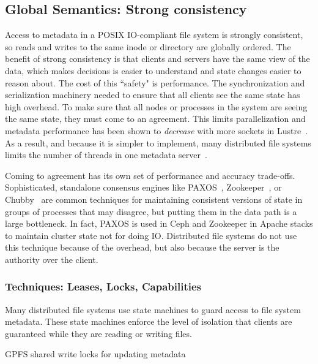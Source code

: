 \subsection{Global Semantics: Strong consistency}

Access to metadata in a POSIX IO-compliant file system is strongly consistent,
so reads and writes to the same inode or directory are globally ordered.  The
benefit of strong consistency is that clients and servers have the same view of
the data, which makes decisions is easier to understand and state changes
easier to reason about.  The cost of this ``safety" is performance.  The
synchronization and serialization machinery needed to ensure that all clients
see the same state has high overhead.  To make sure that all nodes or processes
in the system are seeing the same state, they must come to an agreement.  This
limits parallelization and metadata performance has been shown to {\it
decrease} with more sockets in
Lustre~\cite{konstantinos:pdsw2014-lustre-metadata}. As a result, and because
it is simpler to implement, many distributed file systems limits the number of
threads in one metadata server~\cite{weil:osdi2006-ceph,
alam:pdsw2011-metadata-scaling, ren:sc2014-indexfs}. 

Coming to agreement has its own set of performance and accuracy trade-offs.
Sophisticated, standalone consensus engines like
PAXOS~\cite{lamport_parttime_1998}, Zookeeper~\cite{hunt_zookeeper_2010}, or
Chubby~\cite{burrows_chubby_2006} are common techniques for maintaining
consistent versions of state in groups of processes that may disagree, but
putting them in the data path is a large bottleneck. In fact, PAXOS is used in
Ceph and Zookeeper in Apache stacks to maintain cluster state not for doing IO.
Distributed file systems do not use this technique because of the overhead, but
also because the server is the authority over the client.

\subsubsection{Techniques: Leases, Locks, Capabilities}

Many distributed file systems use state machines to guard access to file system metadata.
These state machines enforce the level of isolation that clients are guaranteed
while they are reading or writing files.  

GPFS shared write locks for updating
metadata

